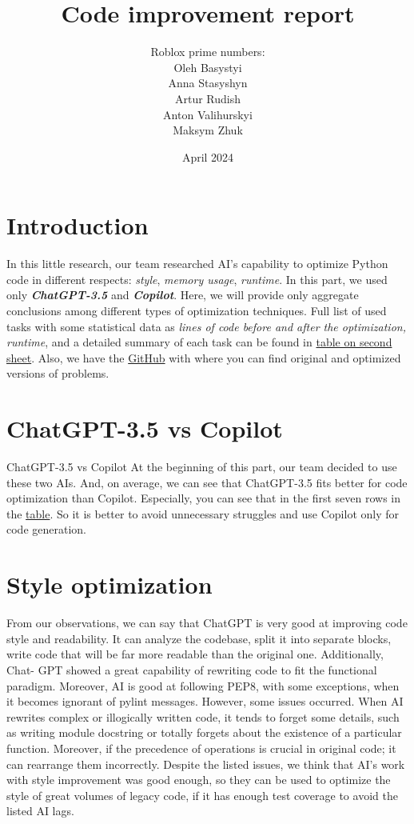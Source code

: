 \documentclass[12pt]{report}
\title{Code improvement report}
\author{Roblox prime numbers:\\\small{Oleh Basystyi}\\\small{Anna Stasyshyn}
	\\\small{Artur Rudish}\\\small{Anton Valihurskyi}\\\small{Maksym Zhuk}}
\date{April 2024}
\begin{document}
	\maketitle
	\renewcommand{\thesection}{\arabic{section}}
	\section{Introduction}
	In this little research, our team researched AI’s capability to optimize Python
	code in different respects: \textit{style}, \textit{memory usage}, \textit{runtime}. In this part, we used
	only \textbf{\textit{ChatGPT-3.5}} and \textbf{\textit{Copilot}}. Here, we will provide only aggregate
	conclusions among different types of optimization techniques. Full list of
	used tasks with some statistical data as \textit{lines of code before and after the
	optimization, runtime}, and a detailed summary of each task can be found in
	\href{https://docs.google.com/spreadsheets/d/1qXPyAJsOOpmtxIoGqObwG5mTaLU3IWO0SQRGbjZPhEc/edit#gid=0}{table on second sheet}. Also, we have the \href{https://github.com/n1n1n1q/Ai-benchmark/tree/main/Ai-tests/Style-and-Code-improvement}{GitHub} with where you can find original and optimized versions of problems.

	\section{ChatGPT-3.5 vs Copilot}

		ChatGPT-3.5 vs Copilot
		At the beginning of this part, our team decided to use these two AIs.
		And, on average, we can see that ChatGPT-3.5 fits better for code optimization
		than Copilot. Especially, you can see that in the first seven rows in the
		 \href{https://docs.google.com/spreadsheets/d/1qXPyAJsOOpmtxIoGqObwG5mTaLU3IWO0SQRGbjZPhEc/edit#gid=0}{table}.
		So it is better to avoid unnecessary struggles and use Copilot only for code generation.



	\section{Style optimization}

		From our observations, we can say that ChatGPT is very good at improving code style and readability.
		It can analyze the codebase, split it into separate
		blocks, write code that will be far more readable than the original one. Additionally, Chat-
		GPT showed a great capability of rewriting code to fit the functional paradigm.
		Moreover, AI is good at following PEP8, with some exceptions, when it becomes
		ignorant of pylint messages.
		However, some issues occurred. When AI rewrites complex or illogically
		written code, it tends to forget some details, such as writing module docstring or
		totally forgets about the existence of a particular function. Moreover, if the precedence
		of operations is crucial in original code; it can rearrange them incorrectly.
		Despite the listed issues, we think that AI’s work with style improvement was good
		enough, so they can be used to optimize the style of great volumes of legacy code,
		if it has enough test coverage to avoid the listed AI lags.
\end{document}
